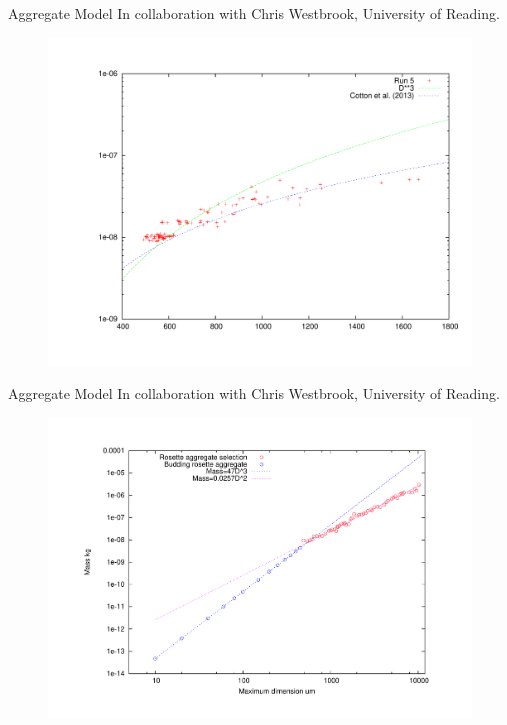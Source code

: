 \documentclass[12pt]{beamer}
\begin{document}
\begin{frame}{Aggregate Model}
In collaboration with Chris Westbrook, University of Reading.
\vspace{-1cm}
\begin{figure}
    \centering
    \includegraphics[width = \textwidth]{Figures/mass_dcubed_rosette_aggregates.pdf}
\end{figure}
    
\end{frame}

\begin{frame}{Aggregate Model}
In collaboration with Chris Westbrook, University of Reading.
\vspace{-1cm}
\begin{figure}
    \centering
    \includegraphics[width = \textwidth]{Figures/selected_budding_rosette_aggregates_all.pdf}
\end{figure}
\end{frame}
\end{document}

